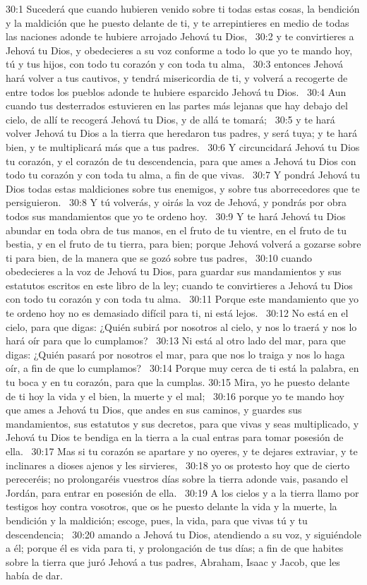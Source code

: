 30:1 Sucederá que cuando hubieren venido sobre ti todas estas cosas, la bendición y la maldición que he puesto delante de ti, y te arrepintieres en medio de todas las naciones adonde te hubiere arrojado Jehová tu Dios,  
30:2 y te convirtieres a Jehová tu Dios, y obedecieres a su voz conforme a todo lo que yo te mando hoy, tú y tus hijos, con todo tu corazón y con toda tu alma,  
30:3 entonces Jehová hará volver a tus cautivos, y tendrá misericordia de ti, y volverá a recogerte de entre todos los pueblos adonde te hubiere esparcido Jehová tu Dios.  
30:4 Aun cuando tus desterrados estuvieren en las partes más lejanas que hay debajo del cielo, de allí te recogerá Jehová tu Dios, y de allá te tomará;  
30:5 y te hará volver Jehová tu Dios a la tierra que heredaron tus padres, y será tuya; y te hará bien, y te multiplicará más que a tus padres.  
30:6 Y circuncidará Jehová tu Dios tu corazón, y el corazón de tu descendencia, para que ames a Jehová tu Dios con todo tu corazón y con toda tu alma, a fin de que vivas.  
30:7 Y pondrá Jehová tu Dios todas estas maldiciones sobre tus enemigos, y sobre tus aborrecedores que te persiguieron.  
30:8 Y tú volverás, y oirás la voz de Jehová, y pondrás por obra todos sus mandamientos que yo te ordeno hoy.  
30:9 Y te hará Jehová tu Dios abundar en toda obra de tus manos, en el fruto de tu vientre, en el fruto de tu bestia, y en el fruto de tu tierra, para bien; porque Jehová volverá a gozarse sobre ti para bien, de la manera que se gozó sobre tus padres,  
30:10 cuando obedecieres a la voz de Jehová tu Dios, para guardar sus mandamientos y sus estatutos escritos en este libro de la ley; cuando te convirtieres a Jehová tu Dios con todo tu corazón y con toda tu alma.  
30:11 Porque este mandamiento que yo te ordeno hoy no es demasiado difícil para ti, ni está lejos.  
30:12 No está en el cielo, para que digas: ¿Quién subirá por nosotros al cielo, y nos lo traerá y nos lo hará oír para que lo cumplamos?  
30:13 Ni está al otro lado del mar, para que digas: ¿Quién pasará por nosotros el mar, para que nos lo traiga y nos lo haga oír, a fin de que lo cumplamos?  
30:14 Porque muy cerca de ti está la palabra, en tu boca y en tu corazón, para que la cumplas. 
30:15 Mira, yo he puesto delante de ti hoy la vida y el bien, la muerte y el mal;  
30:16 porque yo te mando hoy que ames a Jehová tu Dios, que andes en sus caminos, y guardes sus mandamientos, sus estatutos y sus decretos, para que vivas y seas multiplicado, y Jehová tu Dios te bendiga en la tierra a la cual entras para tomar posesión de ella.  
30:17 Mas si tu corazón se apartare y no oyeres, y te dejares extraviar, y te inclinares a dioses ajenos y les sirvieres,  
30:18 yo os protesto hoy que de cierto pereceréis; no prolongaréis vuestros días sobre la tierra adonde vais, pasando el Jordán, para entrar en posesión de ella.  
30:19 A los cielos y a la tierra llamo por testigos hoy contra vosotros, que os he puesto delante la vida y la muerte, la bendición y la maldición; escoge, pues, la vida, para que vivas tú y tu descendencia;  
30:20 amando a Jehová tu Dios, atendiendo a su voz, y siguiéndole a él; porque él es vida para ti, y prolongación de tus días; a fin de que habites sobre la tierra que juró Jehová a tus padres, Abraham, Isaac y Jacob, que les había de dar.  
